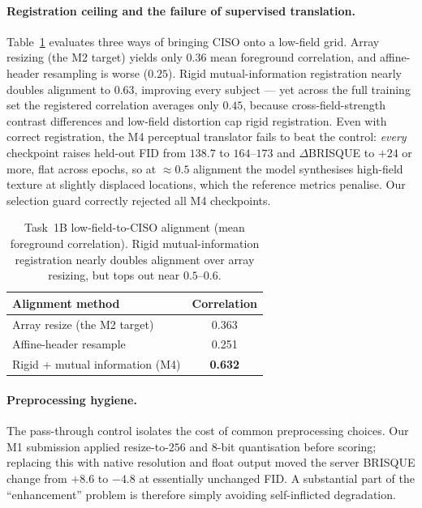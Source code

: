 \documentclass[runningheads]{llncs}
\begin{document}
\paragraph{Registration ceiling and the failure of supervised translation.}
Table~\ref{tab:reg} evaluates three ways of bringing CISO onto a low-field grid.
Array resizing (the M2 target) yields only $0.36$ mean foreground correlation,
and affine-header resampling is worse ($0.25$). Rigid mutual-information
registration nearly doubles alignment to $0.63$, improving every subject --- yet
across the full training set the registered correlation averages only $0.45$,
because cross-field-strength contrast differences and low-field distortion cap
rigid registration. Even with correct registration, the M4 perceptual translator
fails to beat the control: \emph{every} checkpoint raises held-out FID from
$138.7$ to $164$--$173$ and $\Delta$BRISQUE to $+24$ or more, flat across epochs,
so at $\approx0.5$ alignment the model synthesises high-field texture at
slightly displaced locations, which the reference metrics penalise. Our selection guard correctly rejected all M4
checkpoints.

\begin{table}[htbp]
\caption{Task~1B low-field-to-CISO alignment (mean foreground correlation).
Rigid mutual-information registration nearly doubles alignment over array
resizing, but tops out near $0.5$--$0.6$.}
\label{tab:reg}
\centering
\small
\begin{tabular}{lc}
\toprule
Alignment method & Correlation \\
\midrule
Array resize (the M2 target)        & 0.363 \\
Affine-header resample              & 0.251 \\
Rigid + mutual information (M4)     & \textbf{0.632} \\
\bottomrule
\end{tabular}
\end{table}

\paragraph{Preprocessing hygiene.}
The pass-through control isolates the cost of common preprocessing choices. Our
M1 submission applied resize-to-$256$ and 8-bit quantisation before scoring;
replacing this with native resolution and float output moved the server BRISQUE
change from $+8.6$ to $-4.8$ at essentially unchanged FID. A substantial part of
the ``enhancement'' problem is therefore simply avoiding self-inflicted
degradation.
\end{document}
